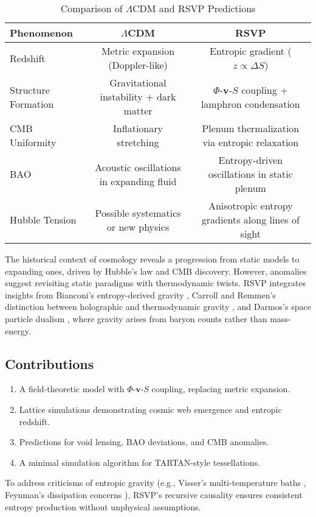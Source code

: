 \documentclass[11pt]{article}
\theoremstyle{plain}
\theoremstyle{definition}
\begin{document}
\begin{table}[ht]
\centering
\caption{Comparison of $\Lambda$CDM and RSVP Predictions}
\label{tab:comparison}
\begin{tabular}{lcc}
\toprule
Phenomenon & $\Lambda$CDM & RSVP \\
\midrule
Redshift & Metric expansion (Doppler-like) & Entropic gradient ($z \propto \Delta S$) \\
Structure Formation & Gravitational instability + dark matter & $\Phi$-$\bm{v}$-$S$ coupling + lamphron condensation \\
CMB Uniformity & Inflationary stretching & Plenum thermalization via entropic relaxation \\
BAO & Acoustic oscillations in expanding fluid & Entropy-driven oscillations in static plenum \\
Hubble Tension & Possible systematics or new physics & Anisotropic entropy gradients along lines of sight \\
\bottomrule
\end{tabular}
\end{table}
The historical context of cosmology reveals a progression from static models to expanding ones, driven by Hubble's law and CMB discovery. However, anomalies suggest revisiting static paradigms with thermodynamic twists. RSVP integrates insights from Bianconi's entropy-derived gravity \citep{Bianconi2025}, Carroll and Remmen's distinction between holographic and thermodynamic gravity \citep{CarrollRemmen2016}, and Darmos's space particle dualism \citep{Darmos2021}, where gravity arises from baryon counts rather than mass-energy.
\subsection{Contributions}
\begin{enumerate}
    \item A field-theoretic model with $\Phi$-$\bm{v}$-$S$ coupling, replacing metric expansion.
    \item Lattice simulations demonstrating cosmic web emergence and entropic redshift.
    \item Predictions for void lensing, BAO deviations, and CMB anomalies.
    \item A minimal simulation algorithm for TARTAN-style tessellations.
\end{enumerate}
To address criticisms of entropic gravity (e.g., Visser's multi-temperature baths \citep{Visser2011}, Feynman's dissipation concerns \citep{Feynman1964}), RSVP's recursive causality ensures consistent entropy production without unphysical assumptions.
\end{document}
